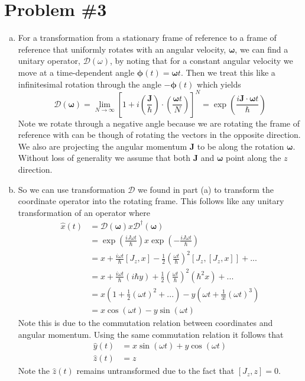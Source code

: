\documentclass[11pt]{article}
\numberwithin{equation}{section}
\begin{document}
\pagebreak

\section{Problem \#3}
\begin{enumerate}[(a)]
\item For a transformation from a stationary frame of reference to a frame of reference that
uniformly rotates with an angular velocity, $\pmb{\omega}$, we can find a unitary operator, 
$\mathscr{D}(\omega)$, by noting that for a constant angular velocity we move at a
time-dependent angle $\pmb{\phi}(t) = \pmb{\omega}{t}$. Then we treat this like a infinitesimal rotation 
through the angle $-\pmb{\phi}(t)$ which yields
$$\mathscr{D}(\pmb{\omega}) = \lim_{N\rightarrow\infty}\left[1+i\left(\frac{\mathbf{J}}{\hbar}\right)\cdot\left(\frac{\pmb{\omega}{t}}{N}\right)\right]^N = \exp\left(\frac{i\mathbf{J}\cdot\pmb{\omega}{t}}{\hbar}\right)$$
Note we rotate through a negative angle because we are rotating the frame of reference with 
can be though of rotating the vectors in the opposite direction. We also are projecting the angular momentum 
$\mathbf{J}$ to be along the rotation $\pmb{\omega}$. Without loss of generality we assume 
that both $\mathbf{J}$ and $\pmb{\omega}$ point along the $z$ direction.

\item So we can use transformation $\mathscr{D}$ we found in part (a) to transform the 
coordinate operator into the rotating frame. This follows like any unitary transformation 
of an operator where
\begin{align*}
\hat{x}(t) &= \mathscr{D}(\pmb{\omega})x\mathscr{D}^{\dagger}(\pmb{\omega})\\
&= \exp\left(\frac{iJ\omega{t}}{\hbar}\right)x\exp\left(-\frac{iJ\omega{t}}{\hbar}\right)\\
&= x + \frac{i\omega{t}}{\hbar}[J_z,x] - \frac{1}{2}\left(\frac{\omega{t}}{\hbar}\right)^2[J_z,[J_z,x]] + ...\\
&= x + \frac{i\omega{t}}{\hbar}(i\hbar{y}) + \frac{1}{2}\left(\frac{\omega{t}}{\hbar}\right)^2(\hbar^2x) + ...\\
&= x\left(1 + \frac{1}{2}(\omega{t})^2 + ...\right) - y\left(\omega{t} + \frac{1}{3!}(\omega{t})^3\right)\\
&= x\cos(\omega{t}) - y\sin(\omega{t})
\end{align*}
Note this is due to the commutation relation between coordinates and angular momentum. Using
the same commutation relation it follows that
\begin{align*}
\hat{y}(t) &= x\sin(\omega{t}) + y\cos(\omega{t})\\
\hat{z}(t) &= z
\end{align*}
Note the $\hat{z}(t)$ remains untransformed due to the fact that $[J_z,z]=0$.


\end{enumerate}
\end{document}
